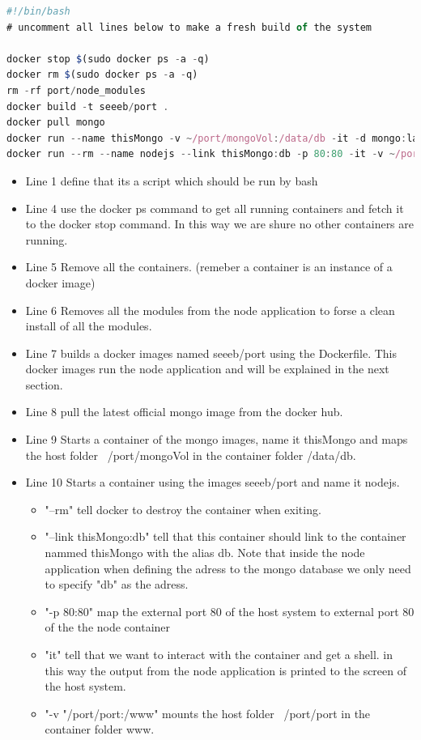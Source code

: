 \documentclass[a4paper,12pt,english]{article}
\begin{document}
\begin{lstlisting}[language=javascript]
#!/bin/bash
# uncomment all lines below to make a fresh build of the system

docker stop $(sudo docker ps -a -q)
docker rm $(sudo docker ps -a -q)
rm -rf port/node_modules
docker build -t seeeb/port .
docker pull mongo
docker run --name thisMongo -v ~/port/mongoVol:/data/db -it -d mongo:latest
docker run --rm --name nodejs --link thisMongo:db -p 80:80 -it -v ~/port/port:/www seeeb/port
\end{lstlisting}
\begin{itemize}
\item Line 1 define that its a script which should be run by bash
\item Line 4 use the docker ps command to get all running containers and fetch it to the docker stop command. In this way we are shure no other containers are running.
\item Line 5 Remove all the containers. (remeber a container is an instance of a docker image)
\item Line 6 Removes all the modules from the node application to forse a clean install of all the modules.
\item Line 7 builds a docker images named seeeb/port using the Dockerfile. This docker images run the node application and will be explained in the next section.
\item Line 8 pull the latest official mongo image from the docker hub.
\item Line 9 Starts a container of the mongo images, name it thisMongo and maps the host folder ~/port/mongoVol in the container folder /data/db.
\item Line 10 Starts a container using the images seeeb/port and name it nodejs.
  \begin{itemize}
  \item "--rm" tell docker to destroy the container when exiting.
  \item "--link thisMongo:db" tell that this container should link to the container nammed thisMongo with the alias db. Note that inside the node application when defining the adress to the mongo database we only need to specify "db" as the adress.
  \item "-p 80:80" map the external port 80 of the host system to external port 80 of the the node container
  \item "it" tell that we want to interact with the container and get a shell. in this way the output from the node application is printed to the screen of the host system.
  \item "-v "/port/port:/www" mounts the host folder ~/port/port in the container folder www.
  \end{itemize} 
\end{itemize}
\end{document}
